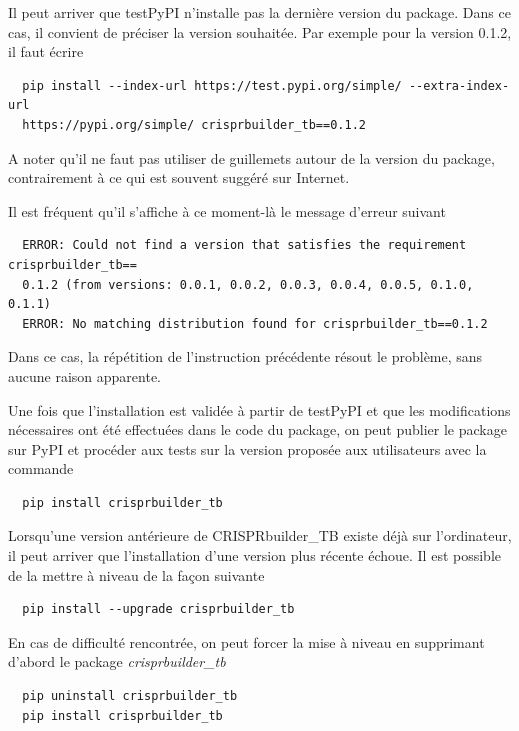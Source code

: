 \documentclass[twoside,a4paper,11pt,frenchb,openany]{report}
\begin{document}
Il peut arriver que testPyPI n'installe pas la dernière version du package. Dans ce cas, il convient de préciser la version souhaitée. Par exemple pour la version 0.1.2, il faut écrire

\begin{verbatim}  pip install --index-url https://test.pypi.org/simple/ --extra-index-url 
  https://pypi.org/simple/ crisprbuilder_tb==0.1.2\end{verbatim} 

A noter qu'il ne faut pas utiliser de guillemets autour de la version du package, contrairement à ce qui est souvent suggéré sur Internet.

Il est fréquent qu'il s'affiche à ce moment-là le message d'erreur suivant

\begin{verbatim}  ERROR: Could not find a version that satisfies the requirement crisprbuilder_tb==
  0.1.2 (from versions: 0.0.1, 0.0.2, 0.0.3, 0.0.4, 0.0.5, 0.1.0, 0.1.1)
  ERROR: No matching distribution found for crisprbuilder_tb==0.1.2\end{verbatim}

Dans ce cas, la répétition de l'instruction précédente résout le problème, sans aucune raison apparente.

Une fois que l'installation est validée à partir de testPyPI et que les modifications nécessaires ont été effectuées dans le code du package, on peut publier le package sur PyPI et procéder aux tests sur la version proposée aux utilisateurs avec la commande

\begin{verbatim}
  pip install crisprbuilder_tb
\end{verbatim}

Lorsqu'une version antérieure de CRISPRbuilder\_TB existe déjà sur l'ordinateur, il peut arriver que l'installation d'une version plus récente échoue. Il est possible de la mettre à niveau de la façon suivante
\begin{verbatim}
  pip install --upgrade crisprbuilder_tb
\end{verbatim}

En cas de difficulté rencontrée, on peut forcer la mise à niveau en supprimant d'abord le package \textit{crisprbuilder\_tb}
\begin{verbatim}
  pip uninstall crisprbuilder_tb
  pip install crisprbuilder_tb
\end{verbatim}
\end{document}
